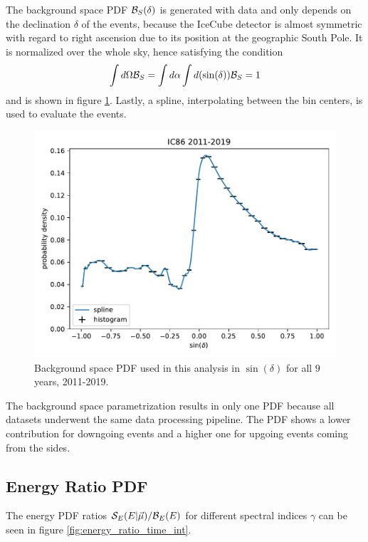 The background space PDF $\mathcal{B}_S(\delta)$ is generated with data and only depends on the declination $\delta$ of the events, because the IceCube detector is almost symmetric with regard to right ascension due to its position at the geographic South Pole.
It is normalized over the whole sky, hence satisfying the condition
\begin{align}
  \int d\Omega \mathcal{B}_S = \int d\alpha \int d(\sin(\delta)) \mathcal{B}_S = 1
\end{align}
and is shown in figure \ref{fig:bg_param_time_int}.
Lastly, a spline, interpolating between the bin centers, is used to evaluate the events.
\begin{figure}
    \centering
    \includegraphics[width=\linewidth]{Plots/05_csky/bg_space_pdf.pdf}
    \caption{Background space PDF used in this analysis in $\sin{(\delta)}$ for all $\num{9}$ years, 2011-2019.}
    \label{fig:bg_param_time_int}
\end{figure}
The background space parametrization results in only one PDF because all datasets underwent the same data processing pipeline.
The PDF shows a lower contribution for downgoing events and a higher one for upgoing events coming from the sides.

\subsection{Energy Ratio PDF}

The energy PDF ratios $\mathcal{S}_E(E|\vec{\mu})/\mathcal{B}_E(E)$ for different spectral indices $\gamma$ can be seen in figure \ref{fig:energy_ratio_time_int}.

